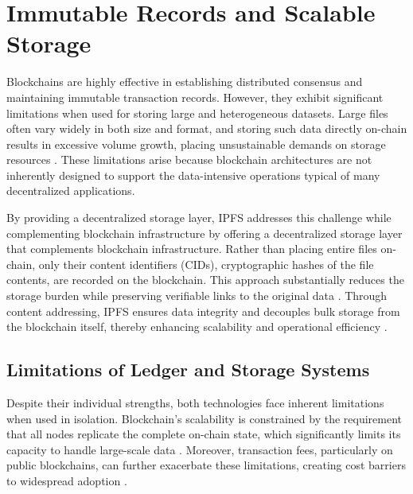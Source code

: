 \documentclass[final]{rc-book-2.14}
\begin{document}
\section{Immutable Records and Scalable Storage}
\label{chp:background:sec:ipfs_bct_comp}

Blockchains are highly effective in establishing distributed consensus and maintaining immutable transaction records. However, they exhibit significant limitations when used for storing large and heterogeneous datasets. Large files often vary widely in both size and format, and storing such data directly on-chain results in excessive volume growth, placing unsustainable demands on storage resources \cite{miller2016scaling, xu2018survey}. These limitations arise because blockchain architectures are not inherently designed to support the data-intensive operations typical of many decentralized applications.

By providing a decentralized storage layer, IPFS addresses this challenge while complementing blockchain infrastructure by offering a decentralized storage layer that complements blockchain infrastructure. Rather than placing entire files on-chain, only their content identifiers (CIDs), cryptographic hashes of the file contents, are recorded on the blockchain. This approach substantially reduces the storage burden while preserving verifiable links to the original data \cite{benet2014ipfs, wood2014ethereum}. Through content addressing, IPFS ensures data integrity and decouples bulk storage from the blockchain itself, thereby enhancing scalability and operational efficiency \cite{zhang2020decentralized}.


\subsection{Limitations of Ledger and Storage Systems}

Despite their individual strengths, both technologies face inherent limitations when used in isolation. Blockchain's scalability is constrained by the requirement that all nodes replicate the complete on-chain state, which significantly limits its capacity to handle large-scale data \cite{steichen2018}. Moreover, transaction fees, particularly on public blockchains, can further exacerbate these limitations, creating cost barriers to widespread adoption \cite{easley_mining_2019}.
\end{document}
